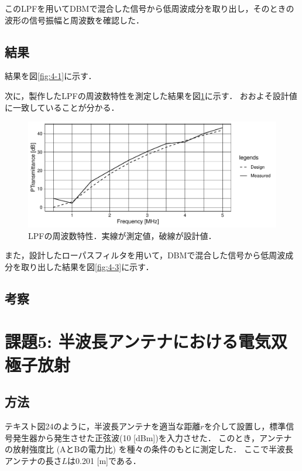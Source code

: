 \documentclass[uplatex,dvipdfmx,a4j,12pt]{jsarticle}
\begin{document}
このLPFを用いてDBMで混合した信号から低周波成分を取り出し，そのときの波形の信号振幅と周波数を確認した．

\subsection{結果}
結果を図\ref{fig:4-1}に示す．



次に，製作したLPFの周波数特性を測定した結果を図\ref{fig:4-2}に示す．
おおよそ設計値に一致していることが分かる．
\begin{figure}[H]
    \centering
    \includegraphics[width=\linewidth]{data/4_1/transmittance.pdf}
    \caption{LPFの周波数特性．実線が測定値，破線が設計値．}
    \label{fig:4-2}
\end{figure}

また，設計したローパスフィルタを用いて，DBMで混合した信号から低周波成分を取り出した結果を図\ref{fig:4-3}に示す．


\subsection{考察}



\section{課題5: 半波長アンテナにおける電気双極子放射}
\subsection{方法}
テキスト図24のように，半波長アンテナを適当な距離$r$を介して設置し，標準信号発生器から発生させた正弦波(10 [dBm])を入力させた．
このとき，アンテナの放射強度比 (AとBの電力比) を種々の条件のもとに測定した．
ここで半波長アンテナの長さ$L$は0.201 [m]である．
\end{document}
